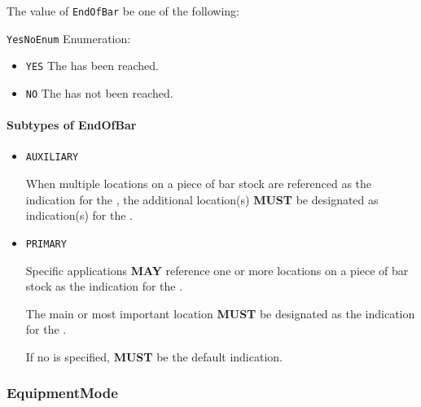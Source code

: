 The value of \texttt{EndOfBar} \MUST be one of the following: 


\texttt{YesNoEnum} Enumeration:

\begin{itemize}
\item \texttt{YES} \newline The  has been reached. 
\item \texttt{NO} \newline The  has not been reached. 
\end{itemize}

\FloatBarrier

\paragraph{Subtypes of EndOfBar}\mbox{}
\label{sec:Subtypes of EndOfBar}

\begin{itemize}

\item \texttt{AUXILIARY}


When multiple locations on a piece of bar stock are referenced as the indication for the , the additional location(s) \textbf{MUST} be designated as  indication(s) for the .  

\item \texttt{PRIMARY}


Specific applications \textbf{MAY} reference one or more locations on a piece of bar stock as the indication for the . 

The main or most important location \textbf{MUST} be designated as the  indication for the .

If no  is specified,  \textbf{MUST} be the default  indication.


\end{itemize}

\subsubsection{EquipmentMode}
\label{sec:EquipmentMode}



